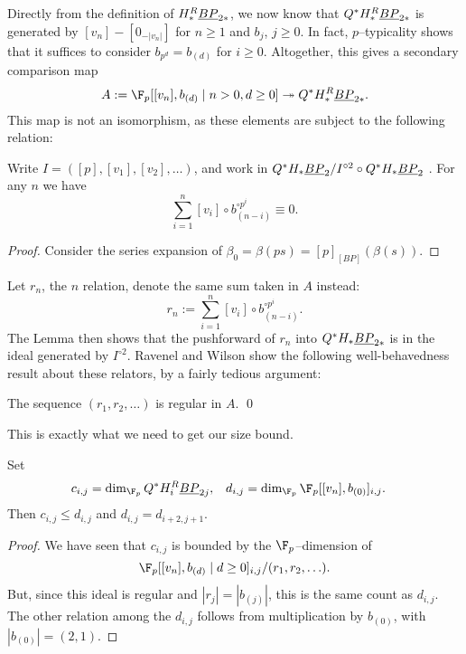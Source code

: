 Directly from the definition of $H_*^R \underline{\smash{BP}}_{2*}$, we now know that $Q^* H_*^R \underline{\smash{BP}}_{2*}$ is generated by $[v_n] - [0_{-|v_n|}]$ for $n \ge 1$ and $b_j$, $j \ge 0$.  In fact, $p$--typicality shows~\cite[Lemma 4.14]{RavenelWilsonHopfRingForMU} that it suffices to consider $b_{p^d} = b_{(d)}$ for $i \ge 0$.  Altogether, this gives a secondary comparison map \[A := \F_p[[v_n], b_{(d)} \mid n > 0, d \ge 0] \onto Q^* H_*^R \OS{BP}{2*}.\]  This map is not an isomorphism, as these elements are subject to the following relation:

\begin{lemma}
Write $I = ([p], [v_1], [v_2], \ldots)$, and work in $Q^* H_* \underline{\smash{BP}}_{2} / I^{\circ 2} \circ Q^* H_* \underline{\smash{BP}}_{2}$ .  For any $n$ we have \[\sum_{i=1}^n [v_i] \circ b_{(n-i)}^{\circ p^i} \equiv 0.\]
\end{lemma}
\begin{proof}
Consider the series expansion of $\beta_0 = \beta(ps) = [p]_{[BP]}(\beta(s))$.
\end{proof}

Let $r_n$, the $n${\th} relation, denote the same sum taken in $A$ instead: \[r_n := \sum_{i=1}^n [v_i] \circ b_{(n-i)}^{\circ p^i}.\]   The Lemma then shows that the pushforward of $r_n$ into $Q^* H_* \underline{\smash{BP}}_{2*}$ is in the ideal generated by $I^{\circ 2}$.  Ravenel and Wilson show the following well-behavedness result about these relators, by a fairly tedious argument:

\begin{lemma}
The sequence $(r_1, r_2, \ldots)$ is regular in $A$. \qed
\end{lemma}

\noindent This is exactly what we need to get our size bound.

\begin{lemma}
Set
\begin{align*}
c_{i,j} & = \dim_{\F_p} Q^* H_i^R \OS{BP}{2j}, &
d_{i,j} & = \dim_{\F_p} \F_p[[v_n], b_{(0)}]_{i,j}.
\end{align*}
Then $c_{i,j} \le d_{i,j}$ and $d_{i,j} = d_{i+2,j+1}$.
\end{lemma}
\begin{proof}
We have seen that $c_{i,j}$ is bounded by the $\F_p$--dimension of \[\F_p[[v_n], b_{(d)} \mid d \ge 0]_{i,j} / (r_1, r_2, \ldots).\]  But, since this ideal is regular and $|r_j| = |b_{(j)}|$, this is the same count as $d_{i,j}$.  The other relation among the $d_{i,j}$ follows from multiplication by $b_{(0)}$, with $|b_{(0)}| = (2, 1)$.
\end{proof}

